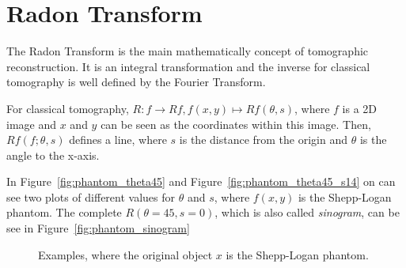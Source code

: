 \section{Radon Transform}
The Radon Transform\cite{radonTransform} is the main mathematically concept of tomographic reconstruction.
It is an integral transformation and the inverse for classical tomography is well defined by the Fourier Transform.

For classical tomography, $R: f \to Rf, f(x,y) \mapsto Rf(\theta, s)$, where $f$ is a 2D image and $x$ and $y$
can be seen as the coordinates within this image. Then, $Rf(f; \theta, s)$ defines a line, where $s$ is the distance 
from the origin and $\theta$ is the angle to the x-axis.

In Figure~\ref{fig:phantom_theta45} and Figure~\ref{fig:phantom_theta45_s14} on can see two plots of different
values for $\theta$ and $s$, where $f(x,y)$ is the Shepp-Logan phantom. The complete $R(\theta=45, s=0)$, 
which is also called \textit{sinogram}, can be see in Figure~\ref{fig:phantom_sinogram}

\begin{figure}[H]
    \centering
    \caption{Examples, where the original object $x$ is the Shepp-Logan phantom.}
\end{figure}